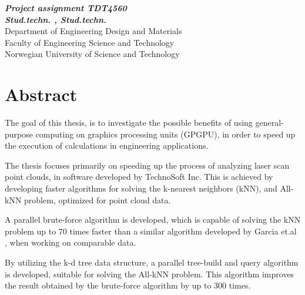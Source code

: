 \begin{center}
{\Large\bfseries \mytitle}
\end{center}

\begin{center}
{\bfseries\slshape Project assignment TDT4560}
\\[1.0cm]
{\bfseries\slshape
Stud.techn. \myauthorA, Stud.techn. \myauthorB \\}
Department of Engineering Design and Materials \\
Faculty of Engineering Science and Technology\\
Norwegian University of Science and Technology
\end{center}
\section*{Abstract}

The goal of this thesis, is to investigate the possible benefits of using general-purpose computing on graphics processing units (GPGPU), in order to speed up the execution of calculations in engineering applications.

The thesis focuses primarily on speeding up the process of analyzing laser scan point clouds, in software developed by TechnoSoft Inc. This is achieved by developing faster algorithms for solving the k-nearest neighbors (kNN), and All-kNN problem, optimized for point cloud data.

A parallel brute-force algorithm is developed, which is capable of solving the kNN problem up to $70$ times faster than a similar algorithm developed by Garcia et.al \cite{Garcia2008}, when working on comparable data.

By utilizing the k-d tree data structure, a parallel tree-build and query algorithm is developed, suitable for solving the All-kNN problem. This algorithm improves the result obtained by the brute-force algorithm by up to $300$ times.







\clearpage\
